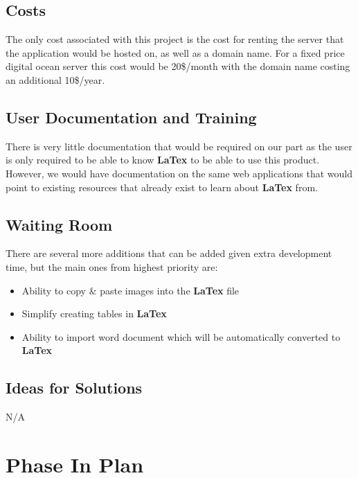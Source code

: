 \documentclass[12pt, titlepage]{article}
\begin{document}
	\subsection{Costs}
	
	The only cost associated with this project is the cost for renting the server that the application would be hosted on, as well as a domain name. For a fixed price digital ocean server this cost would be 20\$/month with the domain name costing an additional 10\$/year.
	
	\subsection{User Documentation and Training}
	
	There is very little documentation that would be required on our part as the user is only required to be able to know \textbf{LaTex} to be able to use this product. However, we would have documentation on the same web applications that would point to existing resources that already exist to learn about \textbf{LaTex} from.
	
	\subsection{Waiting Room}
	There are several more additions that can be added given extra development time, but the main ones from highest priority are:
	\begin{itemize}
		\item Ability to copy \& paste images into the \textbf{LaTex} file
		\item Simplify creating tables in \textbf{LaTex} 
		\item Ability to import word document which will be automatically converted to \textbf{LaTex}
	\end{itemize}
	
	\subsection{Ideas for Solutions}
	N/A
	
	
	
	
	
	\section{Phase In Plan}
	
\end{document}
